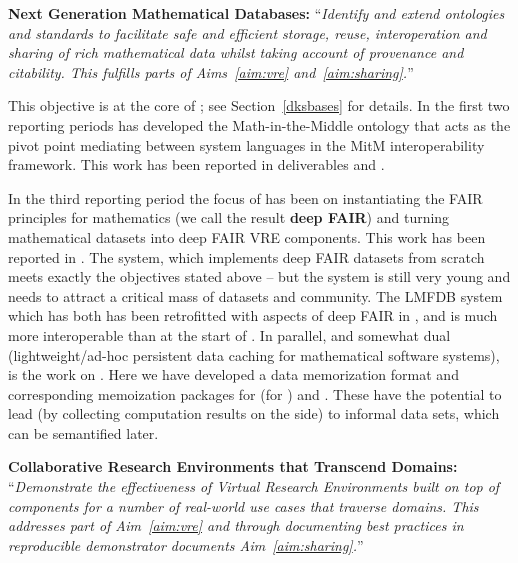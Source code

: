 \begin{compactenum}[\bf {Obj} 1\rm]
\endgroup

\item \label{objective:data}
  \textbf{Next Generation Mathematical Databases:}
  ``\emph{Identify and extend ontologies and
  standards to facilitate safe and efficient storage, reuse,
  interoperation and sharing of rich mathematical data whilst taking
  account of provenance and citability. This fulfills parts of
  Aims~\ref{aim:vre} and~\ref{aim:sharing}.}''

  This objective is at the core of ; see Section~\ref{dksbases} for details.
  In the first two reporting periods  has developed the Math-in-the-Middle ontology that acts as the pivot point mediating between system languages in the MitM interoperability framework.
  This work has been reported in deliverables  and .

  In the third reporting period the focus of  has been on instantiating the FAIR principles for mathematics (we call the result \textbf{deep FAIR}) and turning mathematical datasets into deep FAIR VRE components.
  This work has been reported in .
  The \dmh system, which implements deep FAIR datasets from scratch meets exactly the objectives stated above -- but the system is still very young and needs to attract a critical mass of datasets and community.
  The LMFDB system which has both has been retrofitted with aspects of deep FAIR in \pn, and is much more interoperable than at the start of \pn.
  In parallel, and somewhat dual (lightweight/ad-hoc persistent data caching for mathematical software systems), is the work on . Here we have developed a  data memorization format and corresponding memoization packages for \Python (for \Sage) and \GAP.
  These have the potential to lead (by collecting computation results on the side) to informal data sets, which can be semantified later.

\item \label{objective:demo}
  \textbf{Collaborative Research Environments that Transcend Domains:}
  ``\emph{Demonstrate the effectiveness of Virtual
    Research Environments built on top of \ODK components for a
    number of real-world use cases that traverse domains. This addresses
    part of Aim~\ref{aim:vre} and through documenting best practices in
    reproducible demonstrator documents Aim~\ref{aim:sharing}.}''



\end{compactenum}
